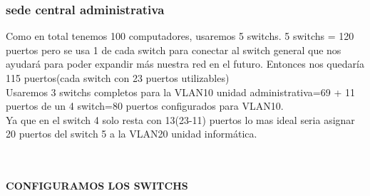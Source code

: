 \subsubsection{sede central administrativa}
Como en total tenemos 100 computadores, usaremos 5 switchs.
5 switchs = 120 puertos pero se usa 1 de cada switch para conectar al switch general que nos ayudará para poder expandir m\'as nuestra red en el futuro.
Entonces nos quedar\'ia 115 puertos(cada switch con 23 puertos utilizables)
\\
Usaremos 3 switchs completos para la VLAN10 unidad administrativa=69 + 11 puertos de un 4 switch=80 puertos configurados para VLAN10.
\\
Ya que en el switch 4 solo resta con 13(23-11) puertos lo mas ideal seria asignar 20 puertos del switch 5 a la VLAN20 unidad inform\'atica.

\\
\\
\textbf{CONFIGURAMOS LOS SWITCHS}

